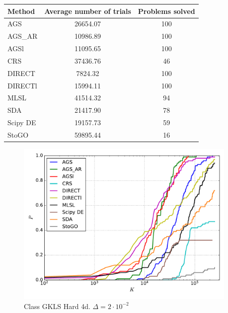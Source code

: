 \documentclass[a4paper]{article}
\begin{document}
\begin{tabular}{lcc}
\hline
 Method   &  Average number of trials  &  Problems solved  \\
\hline
 AGS      &          26654.07          &        100        \\
 AGS\_AR   &          10986.89          &        100        \\
 AGSl     &          11095.65          &        100        \\
 CRS      &          37436.76          &        46         \\
 DIRECT   &          7824.32           &        100        \\
 DIRECTl  &          15994.11          &        100        \\
 MLSL     &          41514.32          &        94         \\
 SDA      &          21417.90          &        78         \\
 Scipy DE &          19157.73          &        59         \\
 StoGO    &          59895.44          &        16         \\
\hline
\end{tabular}
\begin{figure}[H]
  \center
  \includegraphics[width=0.95\textwidth]{../experiments/gklsh4d/cmc.pdf}
  \caption{Class GKLS Hard 4d. $\Delta=2\cdot10^{-2}$}
\end{figure}
\end{document}
